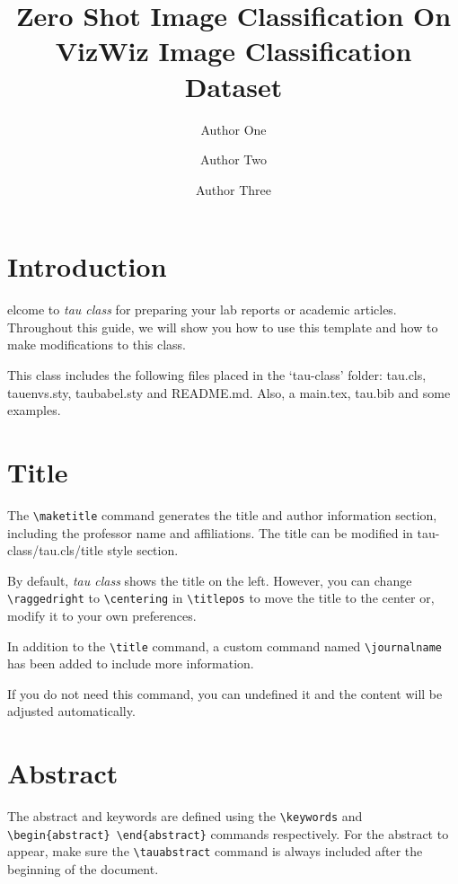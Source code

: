 \documentclass[9pt,a4paper,twocolumn,twoside]{tau-class/tau}
\title{Zero Shot Image Classification On VizWiz Image Classification Dataset}
\author[a,1]{Author One}
\author[b,2]{Author Two}
\author[b,c,3]{Author Three}
\affil[a]{Affiliation of author one}
\affil[b]{Affiliation of author two}
\affil[c]{Affiliation of author three}
\begin{document}
		
    \maketitle 
    \thispagestyle{firststyle} 
    \tauabstract 
    

\section{Introduction}

    elcome to \textit{tau class} for preparing your lab reports or academic articles. Throughout this guide, we will show you how to use this template and how to make modifications to this class. 
	
    This class includes the following files placed in the ‘tau-class’ folder: tau.cls, tauenvs.sty, taubabel.sty and README.md. Also, a main.tex, tau.bib and some examples. 

\section{Title}

    The \verb*|\maketitle| command generates the title and author information section, including the professor name and affiliations. The title can be modified in tau-class/tau.cls/title style section. 
	
    By default, \textit{tau class} shows the title on the left. However, you can change \verb*|\raggedright| to \verb*|\centering| in \verb*|\titlepos| to move the title to the center or, modify it to your own preferences.
	
    In addition to the \verb|\title| command, a custom command named \verb|\journalname| has been added to include more information. 
	
    If you do not need this command, you can undefined it and the content will be adjusted automatically.
	
\section{Abstract}

    The abstract and keywords are defined using the \verb*|\keywords| and \verb*|\begin{abstract} \end{abstract}| commands respectively. For the abstract to appear, make sure the \verb|\tauabstract| command is always included after the beginning of the document.
    
\end{document}
